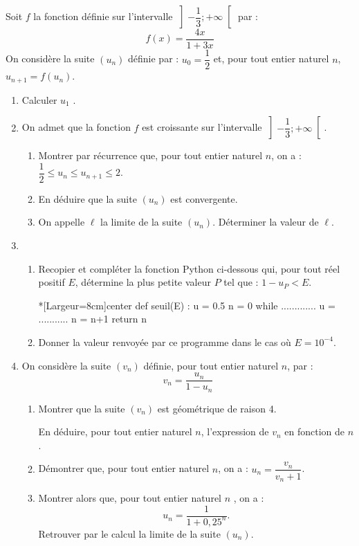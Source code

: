 Soit $f$ la fonction définie sur l'intervalle $\left]-\dfrac{1}{3};+\infty\right[$ par : \[ f(x) = \dfrac{4x}{1 + 3x}\]
%
On considère la suite $\left(u_n\right)$ définie par : $u_0 = \dfrac{1}{2}$ et, pour tout entier naturel $n$, $u_{n+1} = f\left(u_n\right)$.

\begin{enumerate}
	\item Calculer $u_1$ .
	\item On admet que la fonction $f$ est croissante sur l'intervalle $\left]-\dfrac{1}{3};+\infty\right[$.
	\begin{enumerate}
		\item Montrer par récurrence que, pour tout entier naturel $n$, on a : $\dfrac{1}{2} \leqslant u_n \leqslant u_{n+1} \leqslant 2$.
		\item En déduire que la suite $\left(u_n\right)$ est convergente.
		\item On appelle $\ell$ la limite de la suite $\left(u_n\right)$. Déterminer la valeur de $\ell$.
	\end{enumerate}
	\item 
	\begin{enumerate}
		\item Recopier et compléter la fonction \textsf{Python} ci-dessous qui, pour tout réel positif $E$, détermine la plus petite valeur $P$ tel que : $1 - u_{P} < E$.
		
\begin{CodePythonLstAlt}*[Largeur=8cm]{center}
def seuil(E) :
	u = 0.5
	n = 0
	while .............
		u = ...........
		n = n+1
	return n
\end{CodePythonLstAlt}
		\item Donner la valeur renvoyée par ce programme dans le cas où $E = 10^{-4}$.
	\end{enumerate}
	\item On considère la suite $\left(v_n\right)$ définie, pour tout entier naturel $n$, par : \[v_n  = \dfrac{u_n}{1 - u_n}\]
	\begin{enumerate}
		\item Montrer que la suite $\left(v_n\right)$ est géométrique de raison 4.
		
		En déduire, pour tout entier naturel $n$, l'expression de $v_n$ en fonction de $n$.
		\item Démontrer que, pour tout entier naturel $n$, on a : $u_n = \dfrac{v_n}{v_n + 1}$. 
		\item Montrer alors que, pour tout entier naturel $n$ , on a : \[u_n = \dfrac{1}{1 + 0,25^n}.\]
		Retrouver par le calcul la limite de la suite $\left(u_n\right)$.
	\end{enumerate}
\end{enumerate}

